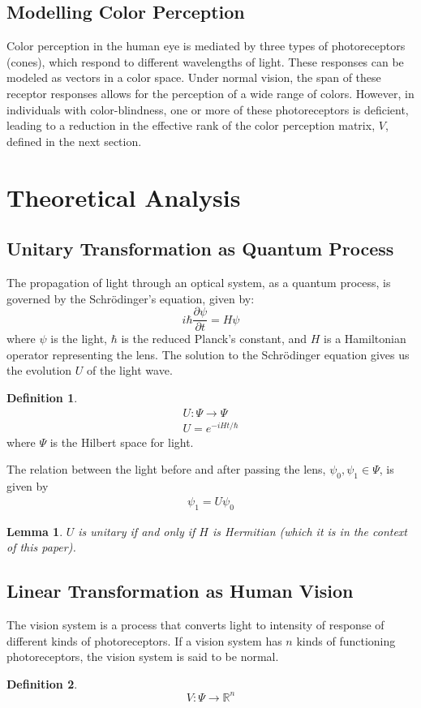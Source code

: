 \documentclass[10pt,a4paper]{article}
\newtheorem{lem}{Lemma}[section]
\theoremstyle{definition}
\newtheorem{defn}{Definition}[section]
\theoremstyle{remark}
\numberwithin{equation}{section}
\newcommand{\Real}{\mathbb R}
\begin{document}
\subsection{Modelling Color Perception}
Color perception in the human eye is mediated by three types of photoreceptors (cones), which respond to different wavelengths of light. These responses can be modeled as vectors in a color space. Under normal vision, the span of these receptor responses allows for the perception of a wide range of colors. However, in individuals with color-blindness, one or more of these photoreceptors is deficient, leading to a reduction in the effective rank of the color perception matrix, $V$, defined in the next section.

\section{Theoretical Analysis}
\subsection{Unitary Transformation as Quantum Process}
The propagation of light through an optical system, as a quantum process, is governed by the Schr\"{o}dinger's equation, given by:
\[
i\hbar \frac{\partial \psi}{\partial t} = H \psi
\]
where \( \psi \) is the light, \( \hbar \) is the reduced Planck's constant, and \( H \) is a Hamiltonian operator representing the lens. The solution to the Schr\"{o}dinger equation gives us the evolution $U$ of the light wave.
\begin{defn}
\begin{eqnarray}
U:\Psi \rightarrow \Psi\\
U = e^{-iHt/\hbar}
\end{eqnarray}
where $\Psi$ is the Hilbert space\cite{linearAlgebra} for light. 
\end{defn}

The relation between the light before and after passing the lens, $\psi_0,\psi_1 \in \Psi$, is given by  
\begin{eqnarray}
\psi_1 = U \psi_0 
\end{eqnarray}
\begin{lem}
$U$ is unitary if and only if $H$ is Hermitian (which it is in the context of this paper). 
\end{lem}

\subsection{Linear Transformation as Human Vision}
The vision system is a process that converts light to intensity of response of different kinds of photoreceptors. If a vision system has $n$ kinds of functioning photoreceptors, the vision system is said to be normal. 
\begin{defn}
\begin{equation}
V:\Psi \rightarrow \Real^n
\end{equation}
\end{defn}
\end{document}
